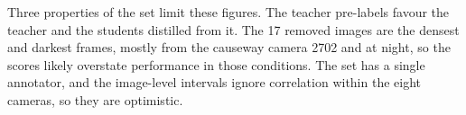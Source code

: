 Three properties of the set limit these figures. The teacher pre-labels favour
the teacher and the students distilled from it. The 17 removed images are the
densest and darkest frames, mostly from the causeway camera 2702 and at night,
so the scores likely overstate performance in those conditions. The set has a
single annotator, and the image-level intervals ignore correlation within the
eight cameras, so they are optimistic.
